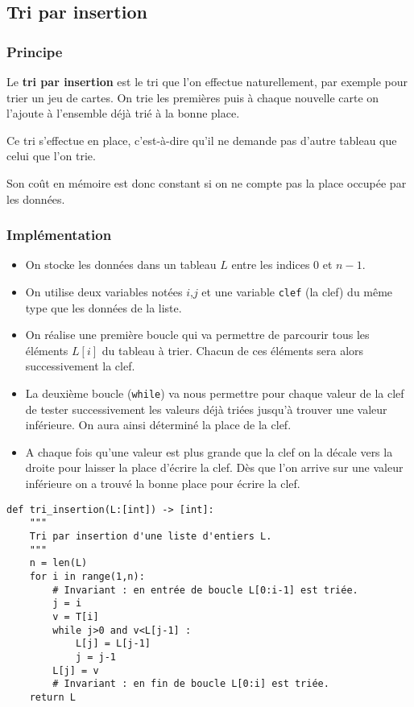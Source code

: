 \subsection{Tri par insertion}
\subsubsection{Principe}

\begin{defi}
Le \textbf{tri par insertion} est le tri que l'on effectue naturellement, par exemple pour trier un jeu de cartes. On trie les premières puis à chaque nouvelle carte on l'ajoute à l'ensemble déjà trié à la bonne place. 

Ce tri s'effectue en place, c'est-à-dire qu'il ne demande pas d'autre tableau que celui que l'on trie. 

Son coût en mémoire est donc constant si on ne compte pas la place occupée par les données.
\end{defi}



\subsubsection{Implémentation}


\begin{itemize}
\item On stocke les données dans un tableau $L$ entre les indices $0$ et $n-1$.
\item On utilise deux variables notées $i$,$j$ et une variable \texttt{clef} (la clef) du même type que les données de la liste.
\item On réalise une première boucle qui va permettre de parcourir tous les éléments $L[i]$ du tableau à trier.
Chacun de ces éléments sera alors successivement la clef.
\item La deuxième boucle (\texttt{while}) va nous permettre pour chaque valeur de la clef de tester successivement les valeurs déjà triées jusqu'à trouver une valeur inférieure. On aura ainsi déterminé la place de la clef.
\item A chaque fois qu'une valeur est plus grande que la clef on la décale vers la droite pour laisser la place d'écrire la clef.
Dès que l'on arrive sur une valeur inférieure on a trouvé la bonne place pour écrire la clef.
\end{itemize}


\begin{lstlisting}
def tri_insertion(L:[int]) -> [int]:
    """
    Tri par insertion d'une liste d'entiers L.
    """
    n = len(L)
    for i in range(1,n):
        # Invariant : en entrée de boucle L[0:i-1] est triée.
        j = i
        v = T[i]
        while j>0 and v<L[j-1] :
            L[j] = L[j-1]
            j = j-1
        L[j] = v
        # Invariant : en fin de boucle L[0:i] est triée.
    return L
\end{lstlisting}    


